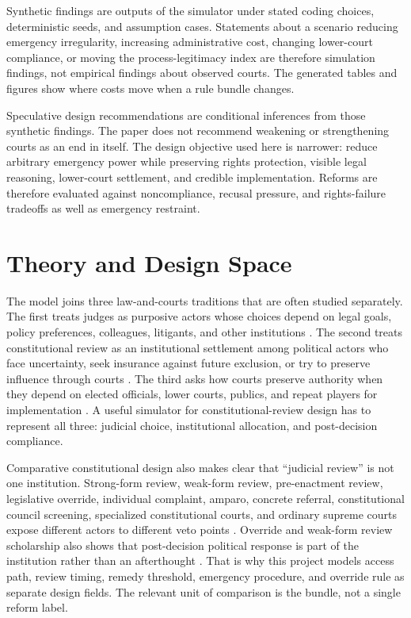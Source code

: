 \documentclass[
    journal=jlc,
    manuscript=research-article,
    year=2026,
  ]{cup-journal}
\newcommand{\jlcite}[1]{\autocite{#1}}
\newcommand{\jlcite}[1]{\citep{#1}}
\begin{document}
Synthetic findings are outputs of the simulator under stated coding choices, deterministic seeds, and assumption cases. Statements about a scenario reducing emergency irregularity, increasing administrative cost, changing lower-court compliance, or moving the process-legitimacy index are therefore simulation findings, not empirical findings about observed courts. The generated tables and figures show where costs move when a rule bundle changes.

Speculative design recommendations are conditional inferences from those synthetic findings. The paper does not recommend weakening or strengthening courts as an end in itself. The design objective used here is narrower: reduce arbitrary emergency power while preserving rights protection, visible legal reasoning, lower-court settlement, and credible implementation. Reforms are therefore evaluated against noncompliance, recusal pressure, and rights-failure tradeoffs as well as emergency restraint.

\section{Theory and Design Space}

The model joins three law-and-courts traditions that are often studied separately. The first treats judges as purposive actors whose choices depend on legal goals, policy preferences, colleagues, litigants, and other institutions \jlcite{SegalSpaeth2002,EpsteinKnight1998,ClaytonGillman1999}. The second treats constitutional review as an institutional settlement among political actors who face uncertainty, seek insurance against future exclusion, or try to preserve influence through courts \jlcite{Ginsburg2003,Hirschl2004,DixonGinsburg2017}. The third asks how courts preserve authority when they depend on elected officials, lower courts, publics, and repeat players for implementation \jlcite{Vanberg2005,Staton2010}. A useful simulator for constitutional-review design has to represent all three: judicial choice, institutional allocation, and post-decision compliance.

Comparative constitutional design also makes clear that ``judicial review'' is not one institution. Strong-form review, weak-form review, pre-enactment review, legislative override, individual complaint, amparo, concrete referral, constitutional council screening, specialized constitutional courts, and ordinary supreme courts expose different actors to different veto points \jlcite{Tushnet2008,Gardbaum2013,StoneSweet2000,BrewerCarias2009,KommersMiller2012}. Override and weak-form review scholarship also shows that post-decision political response is part of the institution rather than an afterthought \jlcite{HoggBushell1997,FerreresComella2009}. That is why this project models access path, review timing, remedy threshold, emergency procedure, and override rule as separate design fields. The relevant unit of comparison is the bundle, not a single reform label.
\end{document}
